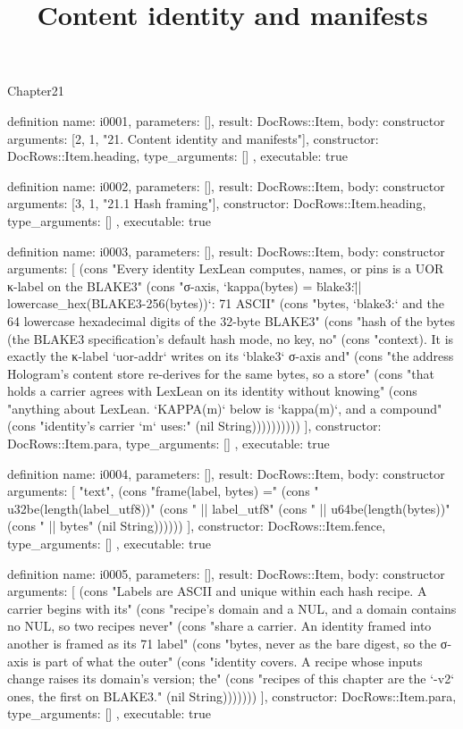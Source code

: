 \begin{lexlean}{Chapter21}
\title{Content identity and manifests}
\begin{semanticmodule}
definition{
  name: i0001,
  parameters: [],
  result: DocRows::Item,
  body: constructor{
    arguments: [2, 1, "21. Content identity and manifests"],
    constructor: DocRows::Item.heading,
    type_arguments: []
  },
  executable: true
}

definition{
  name: i0002,
  parameters: [],
  result: DocRows::Item,
  body: constructor{
    arguments: [3, 1, "21.1 Hash framing"],
    constructor: DocRows::Item.heading,
    type_arguments: []
  },
  executable: true
}

definition{
  name: i0003,
  parameters: [],
  result: DocRows::Item,
  body: constructor{
    arguments: [
      (cons "Every identity LexLean computes, names, or pins is a UOR κ-label on the BLAKE3" (cons "σ-axis, `kappa(bytes) = \"blake3:\" || lowercase_hex(BLAKE3-256(bytes))`: 71 ASCII" (cons "bytes, `blake3:` and the 64 lowercase hexadecimal digits of the 32-byte BLAKE3" (cons "hash of the bytes (the BLAKE3 specification's default hash mode, no key, no" (cons "context). It is exactly the κ-label `uor-addr` writes on its `blake3` σ-axis and" (cons "the address Hologram's content store re-derives for the same bytes, so a store" (cons "that holds a carrier agrees with LexLean on its identity without knowing" (cons "anything about LexLean. `KAPPA(m)` below is `kappa(m)`, and a compound" (cons "identity's carrier `m` uses:" (nil String))))))))))
    ],
    constructor: DocRows::Item.para,
    type_arguments: []
  },
  executable: true
}

definition{
  name: i0004,
  parameters: [],
  result: DocRows::Item,
  body: constructor{
    arguments: [
      "text",
      (cons "frame(label, bytes) =" (cons "  u32be(length(label_utf8))" (cons "  || label_utf8" (cons "  || u64be(length(bytes))" (cons "  || bytes" (nil String))))))
    ],
    constructor: DocRows::Item.fence,
    type_arguments: []
  },
  executable: true
}

definition{
  name: i0005,
  parameters: [],
  result: DocRows::Item,
  body: constructor{
    arguments: [
      (cons "Labels are ASCII and unique within each hash recipe. A carrier begins with its" (cons "recipe's domain and a NUL, and a domain contains no NUL, so two recipes never" (cons "share a carrier. An identity framed into another is framed as its 71 label" (cons "bytes, never as the bare digest, so the σ-axis is part of what the outer" (cons "identity covers. A recipe whose inputs change raises its domain's version; the" (cons "recipes of this chapter are the `-v2` ones, the first on BLAKE3." (nil String)))))))
    ],
    constructor: DocRows::Item.para,
    type_arguments: []
  },
  executable: true
}


\end{semanticmodule}
\end{lexlean}
